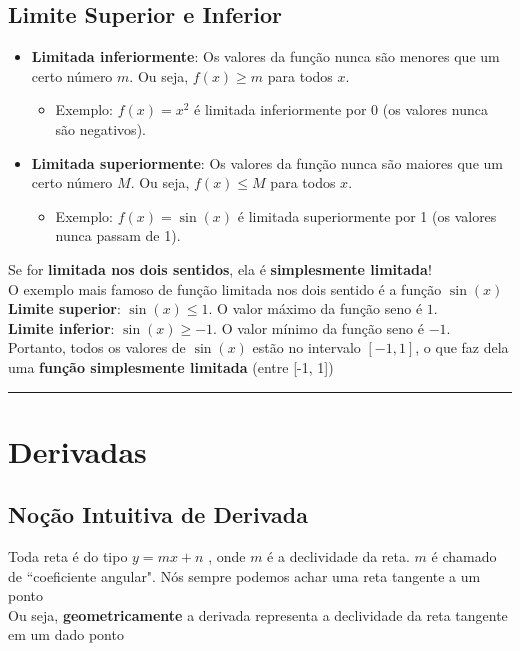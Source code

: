 \documentclass{article}
\begin{document}
\subsection{Limite Superior e Inferior}

\begin{itemize}
    \item \textbf{Limitada inferiormente}: Os valores da função nunca são menores que um certo número \( m \). Ou seja, \( f(x) \geq m \) para todos \( x \). 
    \begin{itemize}
        \item Exemplo: \( f(x) = x^2 \) é limitada inferiormente por 0 (os valores nunca são negativos).
    \end{itemize}

    \item \textbf{Limitada superiormente}: Os valores da função nunca são maiores que um certo número \( M \). Ou seja, \( f(x) \leq M \) para todos \( x \).
    \begin{itemize}
        \item Exemplo: \( f(x) = \sin(x) \) é limitada superiormente por 1 (os valores nunca passam de 1).
    \end{itemize}
\end{itemize}

Se for \textbf{limitada nos dois sentidos}, ela é \textbf{simplesmente limitada}!
\\[10pt]
O exemplo mais famoso de função limitada nos dois sentido é a função \( \sin(x) \)
\\[10pt]
\textbf{Limite superior}: \( \sin(x) \leq 1 \). O valor máximo da função seno é \( 1 \).
\\[5pt]
\textbf{Limite inferior}: \( \sin(x) \geq -1 \). O valor mínimo da função seno é \( -1 \).
\\[10pt]
Portanto, todos os valores de \( \sin(x) \) estão no intervalo \( [-1, 1] \), o que faz dela uma \textbf{função simplesmente limitada} (entre [-1, 1])

\vspace{15pt}
\hrule
\section{Derivadas}

\subsection{Noção Intuitiva de Derivada}
Toda reta é do tipo $y = mx + n$ , onde $m$ é a declividade da reta. $m$ é chamado de ``coeficiente angular". Nós sempre podemos achar uma reta tangente a um ponto
\\[10pt]
Ou seja, \textbf{geometricamente} a derivada representa a declividade da reta tangente em um dado ponto
\end{document}
